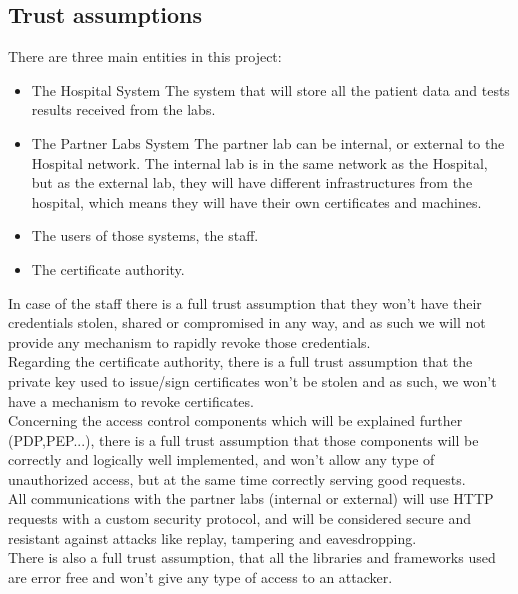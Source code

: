 \subsection{Trust assumptions}


There are three main entities in this project:\\
\begin{itemize}
	\item The Hospital System
		\subitem The system that will store all the patient data and tests results received from the labs.
	\item The Partner Labs System
		\subitem The partner lab can be internal, or external to the Hospital network. The internal lab is in the same network as the Hospital, but as the external lab, they will have different infrastructures from the hospital, which means they will have their own certificates and machines.
	\item The users of those systems, the staff.
	\item The certificate authority.
\end{itemize}


In case of the staff there is a full trust assumption that they won't have their credentials stolen, shared or compromised in any way, and as such we will not provide any mechanism to rapidly revoke those credentials. \\

Regarding the certificate authority, there is a full trust assumption that the private key used to issue/sign certificates won't be stolen and as such, we won't have a mechanism to revoke certificates. \\

Concerning the access control components which will be explained further (PDP,PEP...), there is a full trust assumption that those components will be correctly and logically well implemented, and won't allow any type of unauthorized access, but at the same time correctly serving good requests. \\

All communications with the partner labs (internal or external) will use HTTP requests with a custom security protocol, and will be considered secure and resistant against attacks like replay, tampering and eavesdropping. \\

There is also a full trust assumption, that all the libraries and frameworks used are error free and won't give any type of access to an attacker. \\


